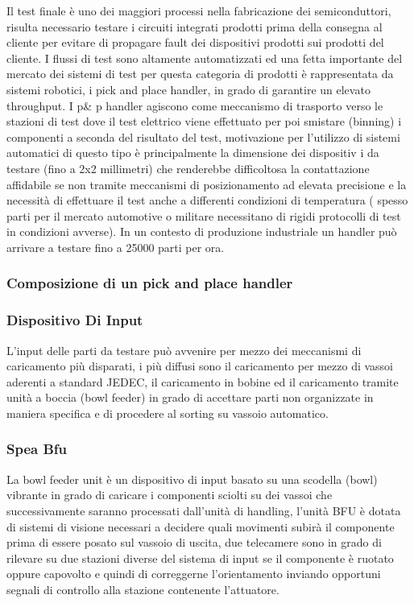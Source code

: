Il test finale è uno dei maggiori processi nella fabricazione dei semiconduttori, risulta necessario testare  i circuiti integrati prodotti prima della consegna al cliente per evitare di propagare fault dei dispositivi prodotti sui prodotti del cliente. 
I flussi di test sono altamente automatizzati ed una fetta importante del mercato dei sistemi di test per 
questa categoria di prodotti è rappresentata da sistemi robotici, i pick and place handler, in grado di 
garantire un elevato throughput. 
I p\& p handler agiscono come meccanismo di trasporto verso le stazioni di test dove il test elettrico viene 
effettuato per poi smistare (binning) i componenti a seconda del risultato del test, motivazione per 
l’utilizzo di sistemi automatici di questo tipo è principalmente la dimensione dei dispositiv i da testare (fino a 2x2 millimetri) che renderebbe difficoltosa la contattazione affidabile se non tramite meccanismi di 
posizionamento ad elevata precisione e la necessità di effettuare il test anche a differenti condizioni di temperatura ( spesso parti per il mercato automotive o militare necessitano di rigidi protocolli di test in 
condizioni avverse). In un contesto di produzione industriale un handler può arrivare a testare fino a 
25000 parti per ora. 

\subsubsection{Composizione di un pick and place handler }

\subsubsection{Dispositivo Di Input }
L’input delle parti da testare può avvenire per mezzo dei meccanismi di caricamento più disparati, i più 
diffusi sono il caricamento per mezzo di vassoi aderenti a standard JEDEC, il caricamento in bobine ed il 
caricamento tramite unità a boccia (bowl feeder) in grado di accettare parti non organizzate in maniera 
specifica e di procedere al sorting su vassoio automatico.  

\subsubsection{Spea Bfu} 

La bowl feeder unit è un dispositivo di input basato su una scodella (bowl) vibrante in grado di caricare i 
componenti sciolti su dei vassoi che successivamente saranno processati dall’unità di handling, l’unità BFU 
è dotata di sistemi di visione necessari a decidere quali movimenti subirà il componente prima di essere 
posato sul vassoio di uscita, due telecamere sono in grado di rilevare su due stazioni diverse del sistema 
di input se il componente è ruotato oppure capovolto e quindi di correggerne l’orientamento inviando 
opportuni segnali di controllo alla stazione contenente l’attuatore.  

